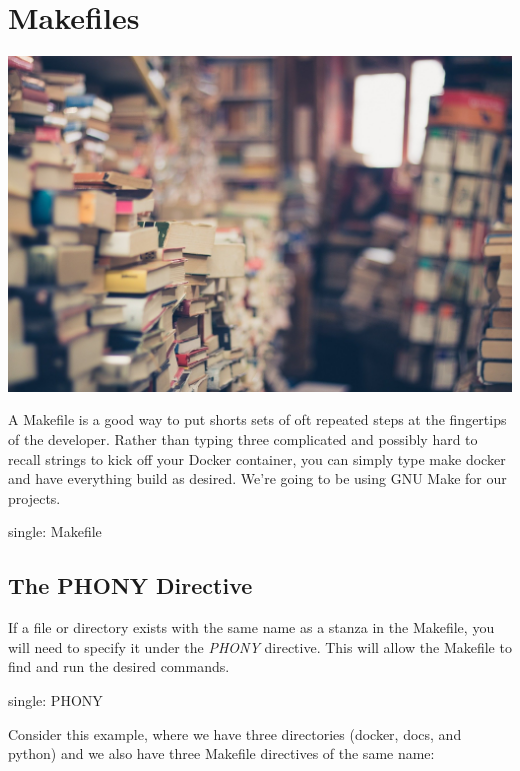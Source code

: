 \makeatletter
{}
\renewcommand{\thefigure}{\thechapter.\@arabic\c@figure}
\makeatother

\hypertarget{makefiles}{%
\section{Makefiles}\label{makefiles}}

\includegraphics{../images/books-1163695_1920.jpg}

A Makefile is a good way to put shorts sets of oft repeated steps at the
fingertips of the developer. Rather than typing three complicated and
possibly hard to recall strings to kick off your Docker container, you
can simply type make docker and have everything build as desired. We're
going to be using GNU Make for our projects.

single: Makefile

\hypertarget{the-phony-directive}{%
\subsection{The PHONY Directive}\label{the-phony-directive}}

If a file or directory exists with the same name as a stanza in the
Makefile, you will need to specify it under the \emph{PHONY} directive.
This will allow the Makefile to find and run the desired commands.

single: PHONY

Consider this example, where we have three directories (docker, docs,
and python) and we also have three Makefile directives of the same name:

\begin{Shaded}
\begin{Highlighting}[]
\end{Highlighting}
\end{Shaded}


